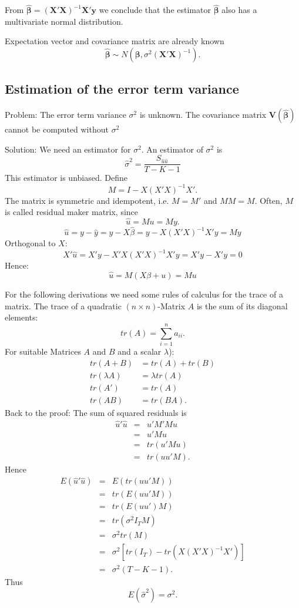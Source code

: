 \documentclass{article}
\begin{document}
From $\mathbf{\hat{\beta}=}\left( \mathbf{X}'\mathbf{X}\right) ^{-1}\mathbf{X}'\mathbf{y}$ 
we conclude that the estimator $\mathbf{\hat{\beta}}$ also has a multivariate normal distribution.

Expectation vector and covariance matrix are already known
\[ \mathbf{\hat{\beta}}\sim N\left( \mathbf{\beta },\sigma ^{2}\left( \mathbf{X}'\mathbf{X}\right) ^{-1}\right). \]

\subsection*{Estimation of the error term variance}

Problem: The error term variance $\sigma ^{2}$ is unknown. The covariance matrix $\mathbf{V}(\mathbf{\hat{\beta}})$ cannot be
computed without $\sigma ^{2}$

Solution: We need an estimator for $\sigma^2$. An estimator of $\sigma ^{2}$ is
\[ \hat{\sigma}^{2}=\frac{S_{\hat{u}\hat{u}}}{T-K-1} \]
This estimator is unbiased. Define
\[ M=I-X(X'X)^{-1}X'.\]
The matrix is symmetric and idempotent, i.e. $M=M'$ and $MM=M$. 
Often, $M$ is called residual maker matrix, since
\[ \hat{u}=Mu=My. \]
$$\hat{u} = y-\hat{y} = y-X\hat{\beta}= y- X(X'X)^{-1}X'y =My$$
Orthogonal to $X$:
$$X'\hat{u} = X'y - X'X(X'X)^{-1}X'y = X'y -X'y = 0$$
Hence: $$\hat{u} = M(X\beta +u) = Mu$$

For the following derivations we need some rules of calculus for the trace of a matrix. The trace of a quadratic $(n\times n)$-Matrix $A$ is the sum of its diagonal elements:
\[ tr(A)=\sum_{i=1}^n a_{ii}. \]
For suitable Matrices $A$ and $B$ and a scalar $\lambda$):
\begin{align*}
tr(A+B) &= tr(A)+tr(B) \\
tr(\lambda A) &= \lambda tr(A) \\
tr(A') &= tr(A)\\
tr(AB) &= tr(BA).
\end{align*}
Back to the proof:
The sum of squared residuals is
\begin{eqnarray*}
\hat{u}'\hat{u} &=&u'M'Mu \\
&=&u'Mu \\
&=&tr(u'Mu) \\
&=&tr(uu'M).
\end{eqnarray*}%
Hence
\begin{eqnarray*}
E(\hat{u}'\hat{u}) &=&E\left( tr(uu'M)\right) \\
&=&tr(E(uu'M)) \\
&=&tr(E(uu')M) \\
&=&tr(\sigma ^{2}I_{T}M) \\
&=&\sigma ^{2}tr(M) \\
&=&\sigma ^{2}\left[ tr(I_{T})-tr(X(X'X)^{-1}X')\right] \\
&=&\sigma ^{2}(T-K-1).
\end{eqnarray*}%
Thus
\[
E(\hat{\sigma}^{2})=\sigma ^{2}. 
\]
\end{document}
